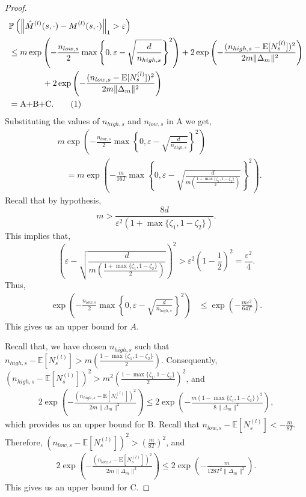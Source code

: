 \documentclass[opre,sglanonrev]{informs4}
\numberwithin{equation}{section}
\newcommand{\pow}[1]{^{(#1)}}
\newcommand{\lp}{\left(}
\newcommand{\rp}{\right)}
\newcommand{\E}{\mathrm{E}}
\newcommand{\Pbb}{\mathbb{P}}
\newcommand{\hatmls}{\Hat{M}^{(l)}(s,\cdot)}
\newcommand{\mls}{{M}^{(l)}(s,\cdot)}
\newcommand\numberthis{\addtocounter{equation}{1}\tag{\theequation}}
\newcommand{\prob}{\Pbb}
\newcommand{\expec}{\mathbb{E}}
\newcommand{\eps}{\varepsilon}
\renewcommand{\epsilon}{\eps}
\begin{document}
\begin{APPENDICES}
\begin{proof}
\begin{align*}
    & \prob\left(\left\|\hatmls-\mls\right\|_1 > \epsilon\right)\\
    &\leq m\exp\left({-\frac{n_{low,s}}{2} \max \left\{0,\epsilon-\sqrt{\frac{d}{n_{high,s}}}\right\}^2}\right) + 2 \exp\left({-{\frac{(n_{high,s}-\E[N_s^{(l)}])^2}{2m\|\Delta_{m}\|^2}}}\right)\\
    & \qquad \qquad + 2\exp\left({-{\frac{(n_{low,s}-\E[N_s^{(l)}])^2}{2m\|\Delta_{m}\|^2}}}\right)\\
    & = \text{A+B+C}.\numberthis\label{eq:main-thmeq7}
\end{align*}
Substituting the values of $n_{high,s}$ and $n_{low,s}$ in A we get, 
\begin{align*}
    & m\exp\left({-\frac{n_{low,s}}{2} \max \left\{0,\epsilon-\sqrt{\frac{d}{n_{high,s}}}\right\}^2}\right) \\
    & \quad = m\exp\left({-\frac{m}{16 T} \max \left\{0,\epsilon-\sqrt{\frac{d}{m\lp\frac{1+\max\{\zeta_1,1-\zeta_2\}}{2}\rp}}\right\}^2}\right).
\end{align*}
Recall that by hypothesis, 
\[
m>\frac{8d}{\epsilon^2\lp1+\max\{\zeta_1,1-\zeta_2\}\rp}.
\] 
This implies that,
\[
\lp\epsilon-\sqrt{\frac{d}{m\lp\frac{1+\max\{\zeta_1,1-\zeta_2\}}{2}\rp}}\rp^2>\epsilon^2\lp1-\frac{1}{2}\rp^2=\frac{\epsilon^2}{4}.
\]
Thus,
\begin{align*}
 \exp\left({-\frac{n_{low,s}}{2} \max \left\{0,\epsilon-\sqrt{\frac{d}{n_{high,s}}}\right\}^2}\right) & \leq \exp\left({-\frac{m\epsilon^2}{64T}}\right).
\end{align*}
This gives us an upper bound for $A$. 

Recall that, we have chosen $n_{high,s}$ such that $n_{high,s}-\expec[N_s\pow{l}]>m\lp\frac{1-\max\{\zeta_1,1-\zeta_2\}}{2}\rp$. Consequently, $\lp n_{high,s}-\expec[N_s\pow{l}]\rp^2>m^2\lp\frac{1-\max\{\zeta_1,1-\zeta_2\}}{2}\rp^2$, and
\begin{align*}
    2 \exp\left({-{\frac{(n_{high,s}-\E[N_s^{(l)}])^2}{2m\|\Delta_{m}\|^2}}}\right) \leq 2 \exp\left({-{\frac{m\lp1-\max\{\zeta_1,1-\zeta_2\}\rp^2}{8\|\Delta_{m}\|^2}}}\right),
\end{align*}
which provides us an upper bound for B.
Recall that $n_{low,s}-\expec[N_s\pow{l}]<-\frac{m}{8T}$. Therefore, $(n_{low,s}-\expec[N_s\pow{l}])^2>\lp\frac{m}{8T}\rp^2$, and
\begin{align*}
    2\exp\left({-{\frac{(n_{low,s}-\E[N_s^{(l)}])^2}{2m\|\Delta_{m}\|^2}}}\right)\leq 2 \exp\left({-{\frac{m}{128T^2\|\Delta_{m}\|^2}}}\right).
\end{align*}
This gives us an upper bound for C.


\end{proof}
\end{APPENDICES}
\end{document}
